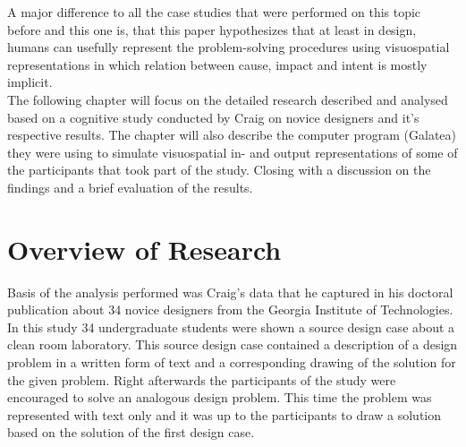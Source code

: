\documentclass[12pt]{article}
\begin{document}
\indent A major difference to all the case studies that were performed on this topic before and this one is, that this paper hypothesizes that at least in design, humans can usefully represent the problem-solving procedures using visuospatial representations in which relation between cause, impact and intent is mostly implicit. \\
\indent The following chapter will focus on the detailed research described and analysed based on a cognitive study conducted by Craig \cite{craig2001perceptual} on novice designers and it's respective results. The chapter will also describe the computer program (Galatea) they were using to simulate visuospatial in- and output representations of some of the participants that took part of the study. Closing with a discussion on the findings and a brief evaluation of the results. 
\section{Overview of Research} %
Basis of the analysis performed was Craig's \cite{craig2001perceptual} %
data that he captured in his doctoral publication about 34 novice designers from the Georgia Institute of Technologies. In this study 34 undergraduate students were shown a source design case about a clean room laboratory. 
This source design case contained a description of a design problem in a written form of text and a corresponding drawing of the solution for the given problem. Right afterwards the participants of the study were encouraged to solve an analogous design problem. This time the problem was represented with text only and it was up to the participants to draw a solution based on the solution of the first design case. %
\end{document}
